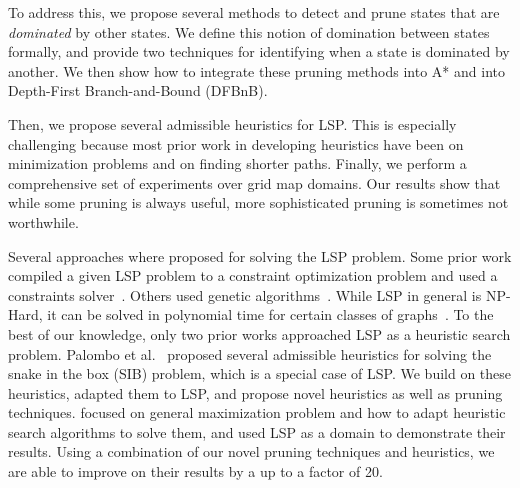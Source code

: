 \documentclass[letterpaper]{article} %
\newcommand{\inlinecite}[1]{\citeauthor{#1} \shortcite{#1}}
\begin{document}
To address this, we propose several methods to detect and prune states that are \emph{dominated} by other states. We define this notion of domination between states formally, and provide two techniques for identifying when a state is dominated by another. We then show how to integrate these pruning methods into A* and into Depth-First Branch-and-Bound (DFBnB). 

Then, we propose several admissible heuristics for LSP. This is especially challenging because most prior work in developing heuristics have been on minimization problems and on finding shorter paths. Finally, we perform a comprehensive set of experiments over grid map domains. Our results show that while some pruning is always useful, more sophisticated pruning is sometimes not worthwhile. 

Several approaches where proposed for solving the LSP problem. 
Some prior work compiled a given LSP problem to a constraint optimization problem and used a constraints solver~\cite{DBLP:conf/cpaior/PhamD12}. Others used genetic algorithms~\cite{DBLP:conf/smc/PortugalAR10}. While LSP in general is NP-Hard, it can be solved in polynomial time for certain classes of graphs~\cite{KeshavarzKohjerdi2012ALA}. 
To the best of our knowledge, only two prior works approached LSP as a heuristic search problem. Palombo et al.~ proposed several admissible heuristics for solving the snake in the box (SIB) problem, which is a special case of LSP. We build on these heuristics, adapted them to LSP, and propose novel heuristics as well as pruning techniques.
\inlinecite{DBLP:conf/socs/SternKPFR14} focused on general maximization problem and how to adapt heuristic search algorithms to solve them, and used LSP as a domain to demonstrate their results. Using a combination of our novel pruning techniques and heuristics, we are able to improve on their results by a up to a factor of 20.








\end{document}
